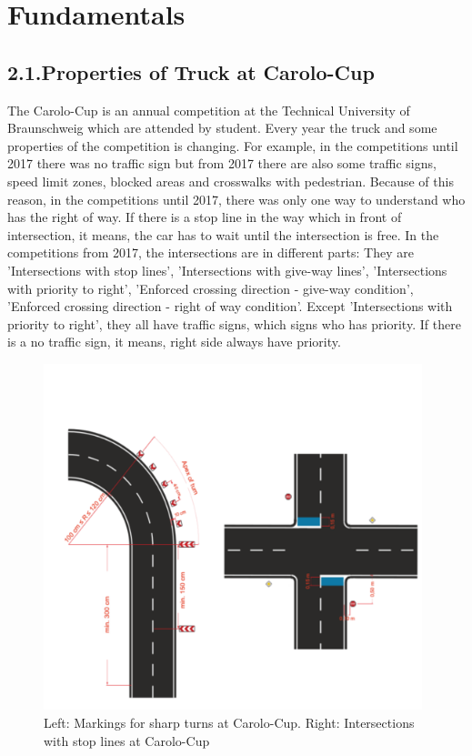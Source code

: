 %
\chapter{Fundamentals}\label{cha:Fundamentals}
%
%
\section*{2.1.Properties of Truck at Carolo-Cup}
\label{sec:Properties of Truck at Carolo-Cup}
%

The Carolo-Cup is an annual competition at the Technical University of Braunschweig 
which are attended by student. Every year the truck and some properties of the 
competition is changing. For example, in the competitions until 2017 there was no 
traffic sign but from 2017 there are also some traffic signs, speed limit zones, 
blocked areas and crosswalks with pedestrian. Because of this reason, in the 
competitions until 2017, there was only one way to understand who has the right of way. 
If there is a stop line in the way which in front of intersection, it means, the car 
has to wait until the intersection is free. In the competitions from 2017, the 
intersections are in different parts: They are 'Intersections with stop lines', 
'Intersections with give-way lines', 'Intersections with priority to right', 
'Enforced crossing direction - give-way condition', 'Enforced crossing direction - 
right of way condition'. Except 'Intersections with priority to right', they all have 
traffic signs, which signs who has priority. If there is a no traffic sign, it means,
right side always have priority.



\begin{figure}[H]
	\centering
	\hspace*{0cm}   
	\includegraphics[width=110mm,scale=1]{./Bilder/Intersections.png}
	\caption{Left: Markings for sharp turns at Carolo-Cup.
Right: Intersections with stop lines at Carolo-Cup}
\end{figure}


